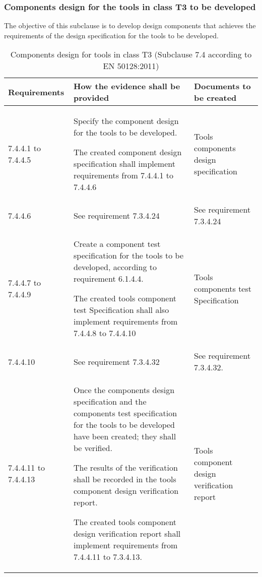 \documentclass{template/openetcs_report}
\begin{document}
\subsubsection{Components design for the tools in class T3 to be developed}
\begin{flushleft}
The objective of this subclause is to develop design components that achieves the requirements of the design specification for the tools to be developed.
\end{flushleft}
{\footnotesize\sffamily\centering
\begin{longtable}{|p{2cm}|p{9cm}|p{3cm}|}
\caption{Components design for tools in class T3 (Subclause 7.4 according to EN 50128:2011)}\\
\hline
\bfseries Requirements & \bfseries How the evidence shall be provided & \bfseries Documents to be created\\
\hline
\hline
\endhead
\hline
\endfoot

7.4.4.1 to 7.4.4.5 & Specify the component design for the tools to be developed. 

The created component design specification shall implement requirements from 7.4.4.1 to 7.4.4.6
& Tools components design specification\\ 
\hline
7.4.4.6 & See requirement 7.3.4.24 & See requirement 7.3.4.24\\ 
\hline
7.4.4.7 to 7.4.4.9 & Create a component test specification for the tools to be developed, according to requirement 6.1.4.4.

The created tools component test Specification shall also implement requirements from 7.4.4.8 to 7.4.4.10
& Tools components test Specification\\ 
\hline
7.4.4.10 & See requirement 7.3.4.32 & See requirement 7.3.4.32.\\ 
\hline
7.4.4.11 to 7.4.4.13 & Once the components design specification and the components test specification for the tools to be developed have been created; they shall be verified.

The results of the verification shall be recorded in the tools component design verification report.

The created tools component design verification report shall implement requirements from 7.4.4.11 to 7.3.4.13.
& Tools component design verification report  \\ 
\hline
\end{longtable}}
\end{document}

